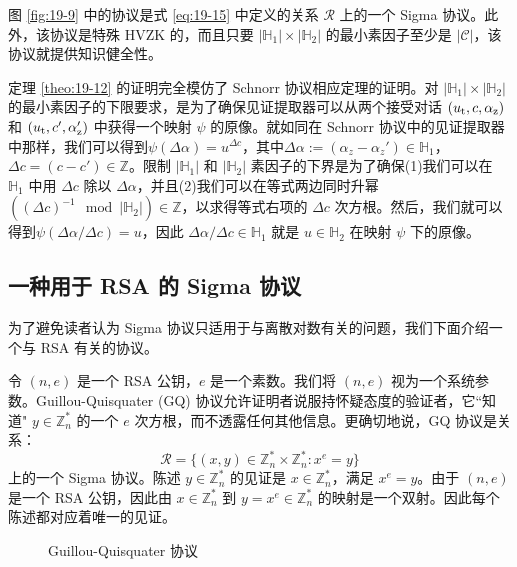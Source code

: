 \begin{theorem}\label{theo:19-12}
图 \ref{fig:19-9} 中的协议是式 \ref{eq:19-15} 中定义的关系 $\mathcal R$ 上的一个 Sigma 协议。此外，该协议是特殊 HVZK 的，而且只要 $|\mathbb{H}_1|\times|\mathbb{H}_2|$ 的最小素因子至少是 $|\mathcal{C}|$，该协议就提供知识健全性。
\end{theorem}

定理 \ref{theo:19-12} 的证明完全模仿了 Schnorr 协议相应定理的证明。对 $|\mathbb{H}_1|\times|\mathbb{H}_2|$ 的最小素因子的下限要求，是为了确保见证提取器可以从两个接受对话 $(u_{\rm t},c,\alpha_{\rm z})$ 和 $(u_{\rm t},c',\alpha_{\rm z}')$ 中获得一个映射 $\psi$ 的原像。就如同在 Schnorr 协议中的见证提取器中那样，我们可以得到$\psi(\Delta\alpha)=u^{\Delta c}$，其中$\Delta\alpha:=(\alpha_z-\alpha_z')\in\mathbb{H}_1$，$\Delta c=(c-c')\in\mathbb{Z}$。限制 $|\mathbb{H}_1|$ 和 $|\mathbb{H}_2|$ 素因子的下界是为了确保(1)我们可以在 $\mathbb{H}_1$ 中用 $\Delta c$ 除以 $\Delta\alpha$，并且(2)我们可以在等式两边同时升幂 $((\Delta c)^{-1}\mod |\mathbb{H}_2|)\in\mathbb{Z}$，以求得等式右项的 $\Delta c$ 次方根。然后，我们就可以得到$\psi({\Delta\alpha}/{\Delta c})=u$，因此 ${\Delta\alpha}/{\Delta c}\in\mathbb{H}_1$ 就是 $u\in\mathbb{H}_2$ 在映射 $\psi$ 下的原像。

\subsection{一种用于 RSA 的 Sigma 协议}\label{subsec:19-5-5}

为了避免读者认为 Sigma 协议只适用于与离散对数有关的问题，我们下面介绍一个与 RSA 有关的协议。

令 $(n,e)$ 是一个 RSA 公钥，$e$ 是一个素数。我们将 $(n,e)$ 视为一个系统参数。Guillou-Quisquater (GQ) 协议允许证明者说服持怀疑态度的验证者，它``知道" $y\in\mathbb{Z}_n^*$ 的一个 $e$ 次方根，而不透露任何其他信息。更确切地说，GQ 协议是关系：
\begin{equation}\label{eq:19-16}
\mathcal{R}=
\bigg\lbrace
(x,y)\in\mathbb{Z}_n^*\times\mathbb{Z}_n^*:x^e=y
\bigg\rbrace
\end{equation}
上的一个 Sigma 协议。陈述 $y\in\mathbb{Z}_n^*$ 的见证是 $x\in\mathbb{Z}_n^*$，满足 $x^e=y$。由于 $(n,e)$ 是一个 RSA 公钥，因此由 $x\in\mathbb{Z}_n^*$ 到 $y=x^e\in\mathbb{Z}_n^*$ 的映射是一个双射。因此每个陈述都对应着唯一的见证。

\begin{figure}
  \centering
  
  \caption{Guillou-Quisquater 协议}
  \label{fig:19-10}
\end{figure}



